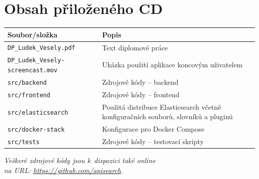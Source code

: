 \documentclass[FM,DP]{tulthesis}
\begin{document}
\chapter{Obsah přiloženého CD}

\begin{center}

\begin{tabular}{L{67mm} L{73mm}} 
\toprule
\textbf{Soubor/složka} & \textbf{Popis} \\
\midrule
\verb|DP_Ludek_Vesely.pdf| & Text diplomové práce\\
\hline
\verb|DP_Ludek_Vesely-screencast.mov| & Ukázka použití aplikace koncovým uživatelem\\
\hline
\verb|src/backend| & Zdrojové kódy -- backend\\
\hline
\verb|src/frontend| & Zdrojové kódy -- frontend\\
\hline
\verb|src/elasticsearch| & Použitá distribuce Elasticsearch včetně konfiguračních souborů, slovníků a pluginů\\
\hline
\verb|src/docker-stack| & Konfigurace pro Docker Compose\\
\hline
\verb|src/tests| & Zdrojové kódy -- testovací skripty\\
\bottomrule
\end{tabular}

\vspace{15mm}

\textit{Veškeré zdrojové kódy jsou k~dispozici také online}\\
\textit{na URL: \url{https://github.com/apisearch}.}

\end{center}


\end{document}
